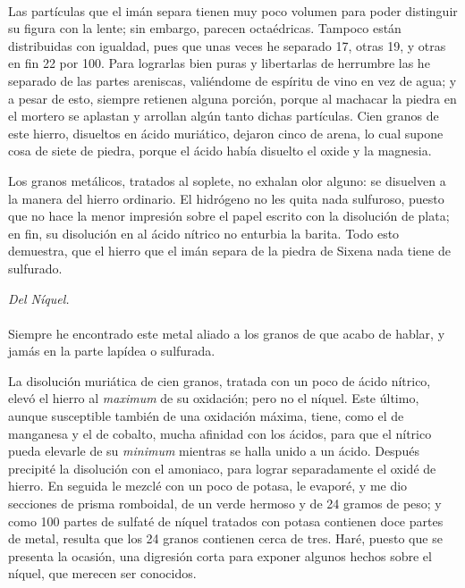 \documentclass[a4paper, 12pt, oneside, spanish]{article}
\begin{document}
\paragraph{}
Las partículas que el imán separa tienen muy poco volumen para poder distinguir su figura con la lente; sin embargo, parecen octaédricas. Tampoco están distribuidas con igualdad, pues que unas veces he separado 17, otras 19, y otras en fin 22 por 100. Para lograrlas bien puras y libertarlas de herrumbre las he separado de las partes areniscas, valiéndome de espíritu de vino en vez de agua; y a pesar de esto, siempre retienen alguna porción, porque al machacar la piedra en el mortero se aplastan y arrollan algún tanto dichas partículas. Cien granos de este hierro, disueltos en ácido muriático, dejaron cinco de arena, lo cual supone cosa de siete de piedra, porque el ácido había disuelto el oxide y la magnesia.

Los granos metálicos, tratados al soplete, no exhalan olor alguno: se disuelven a la manera del hierro ordinario. El hidrógeno no les quita nada sulfuroso, puesto que no hace la menor impresión sobre el papel escrito con la disolución de plata; en fin, su disolución en al ácido nítrico no enturbia la barita. Todo esto demuestra, que el hierro que el imán separa de la piedra de Sixena nada tiene de sulfurado.
\begin{center}
\emph{Del Níquel.}
\end{center}
\paragraph{}
Siempre he encontrado este metal aliado a los granos de que acabo de hablar, y jamás en la parte lapídea o sulfurada.

La disolución muriática de cien granos, tratada con un poco de ácido nítrico, elevó el hierro al \emph{maximum} de su oxidación; pero no el níquel. Este último, aunque susceptible también de una oxidación máxima, tiene, como el de manganesa y el de cobalto, mucha afinidad con los ácidos, para que el nítrico pueda elevarle de su \emph{minimum} mientras se halla unido a un ácido. Después precipité la disolución con el amoniaco, para lograr separadamente el oxidé de hierro. En seguida le mezclé con un poco de potasa, le evaporé, y me dio secciones de prisma romboidal, de un verde hermoso y de 24 gramos de peso; y como 100 partes de sulfaté de níquel tratados con potasa contienen doce partes de metal, resulta que los 24 granos contienen cerca de tres. Haré, puesto que se presenta la ocasión, una digresión corta para exponer algunos hechos sobre el níquel, que merecen ser conocidos.
\end{document}

